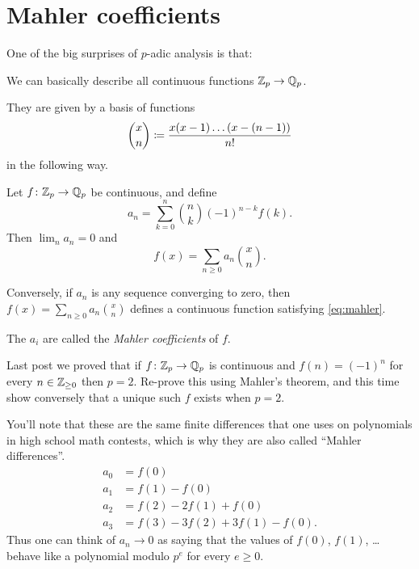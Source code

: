 %

\section{Mahler coefficients}
One of the big surprises of $p$-adic analysis is that:
\begin{moral}
	We can basically describe all continuous functions $\mathbb Z_p \to \mathbb Q_p$.
\end{moral}
They are given by a basis of functions
\[ \binom xn \coloneqq \frac{x(x-1) \dots (x-(n-1))}{n!} \]
in the following way.
\begin{theorem}
	Let $f \colon \mathbb Z_p \to \mathbb Q_p$ be continuous, and define
	\begin{equation}
		a_n = \sum_{k=0}^n \binom nk (-1)^{n-k} f(k).
		\label{eq:mahler}
	\end{equation}
	Then $\lim_n a_n = 0$ and \[ f(x) = \sum_{n \ge 0} a_n \binom xn. \]

	Conversely, if $a_n$ is any sequence converging to zero,
	then $f(x) = \sum_{n \ge 0} a_n \binom xn$
	defines a continuous function satisfying \eqref{eq:mahler}.
\end{theorem}
The $a_i$ are called the \emph{Mahler coefficients} of $f$.
\begin{exercise}
	Last post we proved that if $f \colon \mathbb Z_p \to \mathbb Q_p$ is continuous
	and $f(n) = (-1)^n$ for every $n \in \mathbb Z_{\ge 0}$ then $p = 2$.
	Re-prove this using Mahler's theorem,
	and this time show conversely that a unique such $f$ exists when $p=2$.
\end{exercise}

You'll note that these are the same finite differences that one
uses on polynomials in high school math contests,
which is why they are also called ``Mahler differences''.
\begin{align*}
	a_0 &= f(0) \\
	a_1 &= f(1) - f(0) \\
	a_2 &= f(2) - 2f(1) + f(0) \\
	a_3 &= f(3) - 3f(2) + 3f(1) - f(0).
\end{align*}
Thus one can think of $a_n \to 0$ as saying that
the values of $f(0)$, $f(1)$, \dots behave like a polynomial modulo $p^e$
for every $e \ge 0$.

